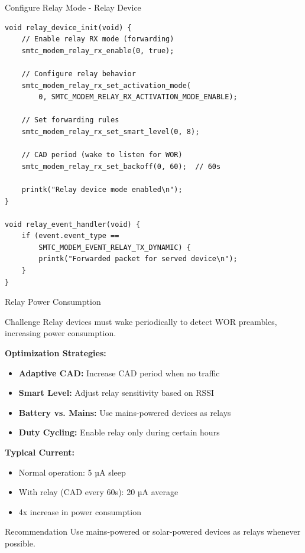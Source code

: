 \documentclass{beamer}
\begin{document}
\begin{frame}[fragile]{Configure Relay Mode - Relay Device}
\begin{lstlisting}[caption={Enable Relay Forwarding}]
void relay_device_init(void) {
    // Enable relay RX mode (forwarding)
    smtc_modem_relay_rx_enable(0, true);

    // Configure relay behavior
    smtc_modem_relay_rx_set_activation_mode(
        0, SMTC_MODEM_RELAY_RX_ACTIVATION_MODE_ENABLE);

    // Set forwarding rules
    smtc_modem_relay_rx_set_smart_level(0, 8);

    // CAD period (wake to listen for WOR)
    smtc_modem_relay_rx_set_backoff(0, 60);  // 60s

    printk("Relay device mode enabled\n");
}

void relay_event_handler(void) {
    if (event.event_type ==
        SMTC_MODEM_EVENT_RELAY_TX_DYNAMIC) {
        printk("Forwarded packet for served device\n");
    }
}
\end{lstlisting}
\end{frame}

\begin{frame}{Relay Power Consumption}
\begin{block}{Challenge}
Relay devices must wake periodically to detect WOR preambles, increasing power consumption.
\end{block}

\vspace{0.3cm}

\textbf{Optimization Strategies:}
\begin{itemize}
    \item \textbf{Adaptive CAD:} Increase CAD period when no traffic
    \item \textbf{Smart Level:} Adjust relay sensitivity based on RSSI
    \item \textbf{Battery vs. Mains:} Use mains-powered devices as relays
    \item \textbf{Duty Cycling:} Enable relay only during certain hours
\end{itemize}

\vspace{0.3cm}

\textbf{Typical Current:}
\begin{itemize}
    \item Normal operation: 5 µA sleep
    \item With relay (CAD every 60s): 20 µA average
    \item 4x increase in power consumption
\end{itemize}

\begin{alertblock}{Recommendation}
Use mains-powered or solar-powered devices as relays whenever possible.
\end{alertblock}
\end{frame}
\end{document}
